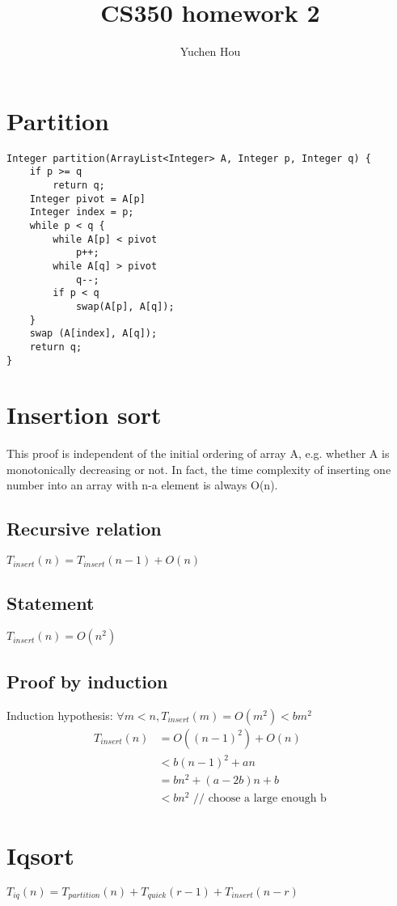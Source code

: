 \documentclass{article}
\begin{document}
\lstset{language=Java}
\title{CS350 homework 2}
\author{Yuchen Hou}
\maketitle

\section{Partition}
\begin{lstlisting}
Integer partition(ArrayList<Integer> A, Integer p, Integer q) {
	if p >= q
		return q;
	Integer pivot = A[p]
	Integer index = p;
	while p < q {
		while A[p] < pivot
			p++;
		while A[q] > pivot
			q--;
		if p < q
			swap(A[p], A[q]);
	}
	swap (A[index], A[q]);
	return q;
}
\end{lstlisting}

\section{Insertion sort}
This proof is independent of the initial ordering of array A, e.g. whether A is
monotonically decreasing or not. In fact, the time complexity of inserting one
number into an array with n-a element is always O(n).

\subsection{Recursive relation}
$T_{insert}(n) = T_{insert}(n - 1) + O(n)$

\subsection{Statement}
$T_{insert}(n) = O(n^2)$

\subsection{Proof by induction}
Induction hypothesis: $\forall m < n, T_{insert}(m) = O(m^2) < b m^2$
\begin{align*}
T_{insert}(n)
&= O((n-1)^2) + O(n)\\
&< b(n-1)^2 + an\\
&= b n^2 + (a - 2b)n + b\\
&< b n^2 \text{ // choose a large enough b}
\end{align*}

\section{Iqsort}
$T_{iq}(n) = T_{partition}(n) + T_{quick}(r-1) + T_{insert}(n-r)$
\end{document}
